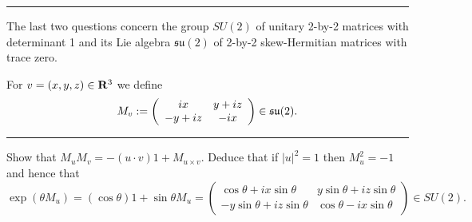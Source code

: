 \documentclass[12pt]{article}
\begin{document}
\hrule
\bigskip
The last two questions concern the group $SU(2)$ of unitary 2-by-2 matrices with determinant 1 and its Lie algebra $\mathfrak{su}(2)$ of 2-by-2 skew-Hermitian matrices with trace zero.

For $v=(x,y,z)\in\mathbf{R}^3$ we define
\[M_v:=\left(\begin{array}{cc}ix & y+iz\\ -y+iz & -ix\end{array}\right)\in\mathfrak{su}(2).\]
\bigskip
\hrule
\bigskip
\begin{question}\label{qun:su2exp}
Show that $M_uM_v=-(u\cdot v)1+M_{u\times v}$. Deduce that if $|u|^2=1$ then $M_u^2=-1$ and hence that
\[\exp(\theta M_u)=(\cos\theta)1+\sin\theta M_u=\left(\begin{array}{cc}
\cos\theta+ix\sin\theta & y\sin\theta+iz\sin\theta\\
-y\sin\theta+iz\sin\theta & \cos\theta-ix\sin\theta
\end{array}\right)\in SU(2).\]
\end{question}

\iffalse
\begin{answer}
If $u=\vect{x}{y}{z}$ and $v=\vect{a}{b}{c}$ then
\begin{align*}\matr{ix}{y+iz}{-y+iz}{-ix}\matr{ia}{b+ic}{-b+ic}{-ia}&=\matr{-ax-by-cz+i(yc-bz)}{az-cx+i(bx-ay)}{cx-az+i(bx-ay)}{-ax-by-cz+i(bz-cy)}\\
&=-(u\cdot v)1+M_{u\times v}
\end{align*}
This implies immediately that if $|u|^2=1$ then $M_u^2=-1$ so
\begin{align*}
\exp(\theta M_u)&=\sum_{n=0}^{\infty}\frac{\theta^n}{n!}M^n_u\\
                &=\sum_{n\equiv 0\mod 2}\frac{\theta^n}{n!}(-1)^{n/2}+\sum_{n\equiv 1\mod 2}\frac{\theta^n}{n!}(-1)^{(n-1)/2}M_u\\
                &=(\cos\theta)1+M_u\sin\theta
\end{align*}
as required.
\end{answer}
\newpage
\fi

\bigskip
\end{document}
